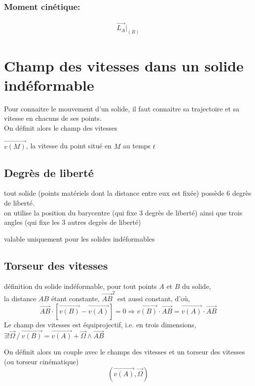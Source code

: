 \documentclass[../main.tex]{subfile}
\begin{document}
\subsubsection{Moment cinétique:}
$$
\begin{aligned}
	\vec{L_A}|_{(R)}
\end{aligned}
$$


\section{Champ des vitesses dans un solide indéformable}

\begin{rap}
	Pour connaitre le mouvement d'un solide, il faut connaitre sa trajectoire et sa vitesse en chacuns de ses points.\\
	On définit alors le champ des vitesses
\end{rap}

\begin{defi}
	$\vec{v(M)}$, la vitesse du point situé en $M$ au temps $t$
\end{defi}

\subsection{Degrès de liberté}
tout solide (points matériels dont la distance entre eux est fixée) possède 6 degrès de liberté.\\

on utilise la position du barycentre (qui fixe 3 degrès de liberté)
ainsi que trois angles %
(qui fixe les 3 autres degrès de liberté)

valable uniquement pour les solides indéformables

\subsection{Torseur des vitesses}

définition du solide indéformable, pour tout points $A$ et $B$ du solide, \\
la distance $AB$ étant constante, $\vec{AB}^2$ est aussi constant, d'où,
$$\vec{AB} \cdot [\vec{v(B)} - \vec{v(A)}] = 0 \Rightarrow \vec{v(B)} \cdot \vec{AB} = \vec{v(A)} \cdot \vec{AB}$$
Le champ des vitesses est équiprojectif, i.e. en trois dimensions, $\exists! \vec{\Omega} \ / \ \vec{v(B)} = \vec{v(A)} + \vec{\Omega} \wedge \vec{AB}$

\begin{defi}
	On définit alors un couple avec le champs des vitesses et un torseur des vitesses (ou torseur cinématique)
	$$(\vec{v(A)}, \vec{\Omega})$$
\end{defi}
\end{document}
